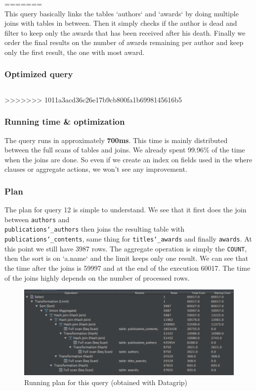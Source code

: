 \documentclass[doubleside, titlepage]{article}
\begin{document}
=======
~\\
This query basically links the tables `authors` and `awards` by doing multiple joins with tables in between. Then it simply checks if the author is dead and filter to keep only the awards that has been received after his death. Finally we order the final results on the number of awards remaining per author and keep only the first result, the one with most award.~\\

\subsubsection{Optimized query}
		\begin{lstlisting}[language=SQL,showspaces=false,basicstyle=\ttfamily,numberstyle=\tiny,commentstyle=\color{gray}]

		\end{lstlisting}

>>>>>>> 1011a3acd36c26e17b9cb800fa1b6998145616b5
\subsubsection{Running time \& optimization}

The query runs in approximately \textbf{700ms}. This time is mainly distributed between the full scans of tables and joins. We already spent 99.96\% of the time when the joins are done. So even if we create an index on fields used in the where clauses or aggregate actions, we won't see any improvement.

\subsubsection{Plan}
The plan for query 12 is simple to understand. We see that it first does the join between \texttt{authors} and ~\\ \texttt{publications\char`_authors} then joins the resulting table with \texttt{publications\char`_contents}, same thing for \texttt{titles\char`_awards} and finally \texttt{awards}. At this point we still have 3987 rows. The aggregate operation is simply the \texttt{COUNT}, then the sort is on `a.name` and the limit keeps only one result.
We can see that the time after the joins is 59997 and at the end of the execution 60017. The time of the joins highly depends on the number of processed rows.

\begin{figure}[!htb]
	\centering
    \includegraphics[scale = 0.5]{./query_analysis/query12}
    \caption{Running plan for this query (obtained with Datagrip)}
\end{figure}
\end{document}
